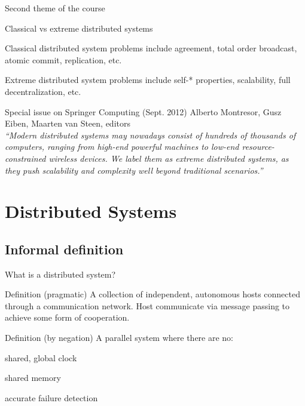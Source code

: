 \begin{frame}{Second theme of the course}

\begin{block}{Classical vs extreme distributed systems}
\BI
\item Classical distributed system problems include agreement, total order
  broadcast, atomic commit, replication, etc.
\item Extreme distributed system problems include self-* properties, 
  scalability, full decentralization, etc.
\EI
\end{block}

\begin{block}{Special issue on Springer Computing (Sept. 2012)}
Alberto Montresor, Gusz Eiben, Maarten van Steen, editors\\

\textit{“Modern distributed systems may nowadays consist of hundreds of
thousands of computers, ranging from high-end powerful machines to low-end
resource-constrained wireless devices. We label them as extreme distributed
systems, as they push scalability and complexity well beyond traditional
scenarios.”}

\end{block}

\end{frame}


\section{Distributed Systems}

\subsection{Informal definition}

\begin{frame}{What is a distributed system?}
	
\begin{block}{Definition (pragmatic)}
A collection of independent, autonomous hosts connected through a
communication network. Host communicate via message passing to achieve some
form of cooperation.
\end{block}

\pause
\bigskip
\begin{block}{Definition (by negation)}
A parallel system where there are no:
\BI
\item shared, global clock
\item shared memory
\item accurate failure detection
\EI
\end{block}

\end{frame}

